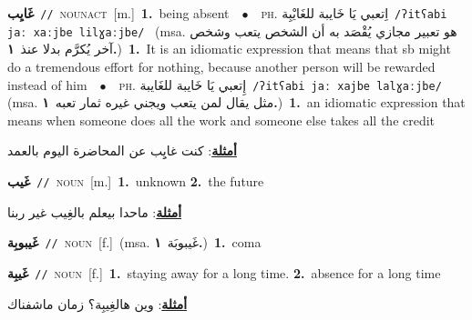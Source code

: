\documentclass[10pt,a4paper,twoside]{article} %
\begin{document}
\begin{multicols}{2}
{\setlength\topsep{0pt}\textbf{\foreignlanguage{arabic}{غَايِب}}\ {\color{gray}\texttt{//}\color{black}}\ \textsc{noun\textunderscore act}\ [m.]\ \textbf{1.}~being absent\ \ $\bullet$\ \ \textsc{ph.} \color{gray} \foreignlanguage{arabic}{اِتعبي يَا خَايبة للغَايْبِة}\color{black}\ {\color{gray}\texttt{/{\sffamily ʔitʕabi jaː xaːjbe lilɣaːjbe}/}\color{black}}\ \color{gray} (msa. \foreignlanguage{arabic}{هو تعبير مجازي يُقْصَد به أن الشخص يتعب وشخص آخر يُكرَّم بدلا عنذ}~\foreignlanguage{arabic}{\textbf{١.}})\color{black}\ \textbf{1.}~It is an idiomatic expression that means that sb might do a tremendous effort for nothing, because another person will be rewarded instead of him\ \ $\bullet$\ \ \textsc{ph.} \color{gray} \foreignlanguage{arabic}{إِتعبي يَا خَايبة للغَايبة}\color{black}\ {\color{gray}\texttt{/{\sffamily ʔitʕabi jaː xajbe lalɣaːjbe}/}\color{black}}\ \color{gray} (msa. \foreignlanguage{arabic}{مثل يقال لمن يتعب ويجني غيره ثمار تعبه}~\foreignlanguage{arabic}{\textbf{١.}})\color{black}\ \textbf{1.}~an idiomatic expression that means when someone does all the work and someone else takes all the credit\  \begin{flushright}\color{gray}\foreignlanguage{arabic}{\textbf{\underline{\foreignlanguage{arabic}{أمثلة}}}: كنت غايِِب عن المحاضرة اليوم بالعمد}\end{flushright}\color{black}} \vspace{2mm}

{\setlength\topsep{0pt}\textbf{\foreignlanguage{arabic}{غَيب}}\ {\color{gray}\texttt{//}\color{black}}\ \textsc{noun}\ [m.]\ \textbf{1.}~unknown  \textbf{2.}~the future\  \begin{flushright}\color{gray}\foreignlanguage{arabic}{\textbf{\underline{\foreignlanguage{arabic}{أمثلة}}}: ماحدا بيعلم بالغِيب غير ربنا}\end{flushright}\color{black}} \vspace{2mm}

{\setlength\topsep{0pt}\textbf{\foreignlanguage{arabic}{غَيبوبِة}}\ {\color{gray}\texttt{//}\color{black}}\ \textsc{noun}\ [f.]\ \color{gray}(msa. \foreignlanguage{arabic}{غَيبوبَة}~\foreignlanguage{arabic}{\textbf{١.}})\color{black}\ \textbf{1.}~coma\ } \vspace{2mm}

{\setlength\topsep{0pt}\textbf{\foreignlanguage{arabic}{غَيبِة}}\ {\color{gray}\texttt{//}\color{black}}\ \textsc{noun}\ [f.]\ \textbf{1.}~staying away for a long time.  \textbf{2.}~absence for a long time\  \begin{flushright}\color{gray}\foreignlanguage{arabic}{\textbf{\underline{\foreignlanguage{arabic}{أمثلة}}}: وين هالغِيبِة؟ زمان ماشفناك}\end{flushright}\color{black}} \vspace{2mm}


\end{multicols}
\end{document}
